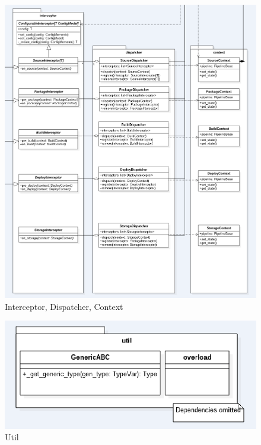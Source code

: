 	\begin{figure}[H]
		\includegraphics[width = 1.2\linewidth]{diagrams/interceptor_context.png}
		\caption{Interceptor, Dispatcher, Context}
	\end{figure}

	\begin{figure}[H]
		\includegraphics[width = 1.2\linewidth]{diagrams/util.png}
		\caption{Util}
	\end{figure}


